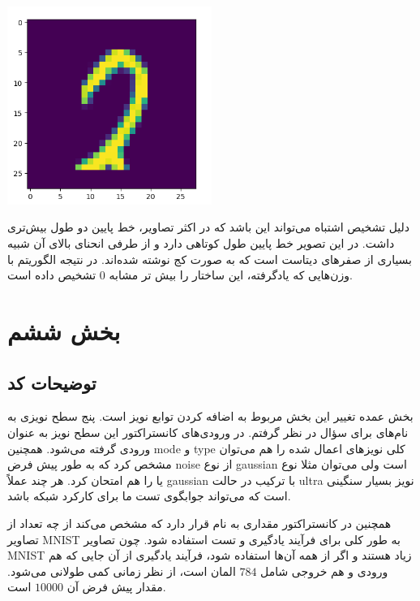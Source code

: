\documentclass[12pt,titlepage,a4page , tikz , multi,table , svgnames,xcdraw]{article}
\begin{document}
\begin{center}

 \includegraphics[width=0.5\textwidth]{pictures/19.png}

\end{center}

دلیل تشخیص اشتباه می‌تواند این باشد که در اکثر تصاویر، خط پایین دو طول بیش‌تری داشت. در این تصویر خط پایین طول کوتاهی دارد و از طرفی انحنای بالای آن شبیه بسیاری از صفرهای دیتاست است که به صورت کج نوشته شده‌اند. در نتیجه الگوریتم با وزن‌هایی که یادگرفته، این ساختار را بیش تر مشابه $0$ تشخیص داده است.



\hrulefill

\newpage

\section{بخش ششم}

\subsection{توضیحات کد}


بخش عمده تغییر این بخش مربوط به اضافه کردن توابع نویز است. پنج سطح نویزی به نام‌های 
 برای سؤال در نظر گرفتم. در ورودی‌های کانستراکتور این سطح نویز به عنوان ورودی گرفته می‌شود. همچنین mode و type کلی نویزهای اعمال شده را هم می‌توان مشخص کرد که به طور پیش فرض noise از نوع gaussian است ولی می‌توان مثلا نوع  یا  را هم امتحان کرد. هر چند عملاً gaussian با ترکیب  در حالت ultra نویز بسیار سنگینی است که می‌تواند جوابگوی تست ما برای کارکرد شبکه باشد.

 همچنین در کانستراکتور مقداری به نام 
قرار دارد که مشخص می‌کند از چه تعداد از تصاویر MNIST به طور کلی برای فرآیند یادگیری و تست استفاده شود. چون تصاویر MNIST زیاد هستند و اگر از همه آن‌ها استفاده شود، فرآیند یادگیری از آن جایی که هم ورودی و هم خروجی شامل $784$ المان است، از نظر زمانی کمی طولانی می‌شود. مقدار پیش فرض آن $10000$ است.
\end{document}
